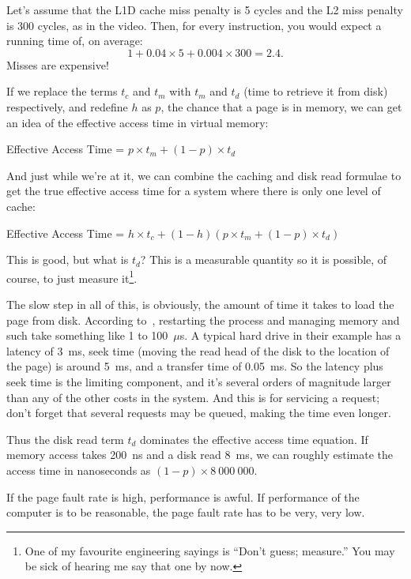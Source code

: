 \documentclass[a4paper]{report}
\begin{document}
Let's assume that the L1D cache miss penalty is 5 cycles and the L2 miss penalty is
300 cycles, as in the video. Then, for every instruction, you would expect a running
time of, on average:
\[ 1 + 0.04 \times 5 + 0.004 \times 300 = 2.4. \]
Misses are expensive!


If we replace the terms $t_{c}$ and $t_{m}$ with $t_{m}$ and $t_{d}$ (time to retrieve it from disk) respectively, and redefine $h$ as $p$, the chance that a page is in memory, we can get an idea of the effective access time in virtual memory: 

\begin{center}
	Effective Access Time = $ p \times t_{m} + (1 - p) \times t_{d}$
\end{center}

And just while we're at it, we can combine the caching and disk read formulae to get the true effective access time for a system where there is only one level of cache:

\begin{center}
	Effective Access Time = $ h \times t_{c} + (1 - h) ( p \times t_{m} + (1 - p) \times t_{d})$
\end{center}

This is good, but what is $t_{d}$? This is a measurable quantity so it is possible, of course, to just measure it\footnote{One of my favourite engineering sayings is ``Don't guess; measure.'' You may be sick of hearing me say that one by now.}.

The slow step in all of this, is obviously, the amount of time it takes to load the page from disk. According to~\cite{osc}, restarting the process and managing memory and such take something like 1 to 100~$\mu$s. A typical hard drive in their example has a latency of 3~ms, seek time (moving the read head of the disk to the location of the page) is around 5~ms, and a transfer time of 0.05~ms. So the latency plus seek time is the limiting component, and it's several orders of magnitude larger than any of the other costs in the system. And this is for servicing a request; don't forget that several requests may be queued, making the time even longer.

Thus the disk read term $t_{d}$ dominates the effective access time equation. If memory access takes 200~ns and a disk read 8~ms, we can roughly estimate the access time in nanoseconds as $(1-p) \times 8~000~000$. 

If the page fault rate is high, performance is awful. If performance of the computer is to be reasonable, the page fault rate has to be very, very low.
\end{document}
